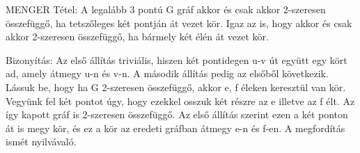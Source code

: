 \begin{framed}
MENGER Tétel: A legalább 3 pontú G gráf akkor és csak akkor 2-szeresen összefüggő, ha tetszőleges két pontján át vezet kör. Igaz az is, hogy akkor és csak akkor 2-szeresen összefüggő, ha bármely két élén át vezet kör.
\end{framed}
\begin{leftbar}
Bizonyítás: Az első állítás triviális, hiszen két pontidegen u-v út együtt egy kört ad, amely átmegy u-n és v-n. A második állítás pedig az elsőből következik. Lássuk be, hogy ha G 2-szeresen összefüggő, akkor e, f éleken keresztül van kör. Vegyünk fel két pontot úgy, hogy ezekkel osszuk két részre az e illetve az f élt. Az így kapott gráf is 2-szeresen összefüggő. Az első állítás szerint ezen a két ponton át is megy kör, és ez a kör az eredeti gráfban átmegy e-n és f-en. A megfordítás ismét nyilvávaló.
\end{leftbar}
